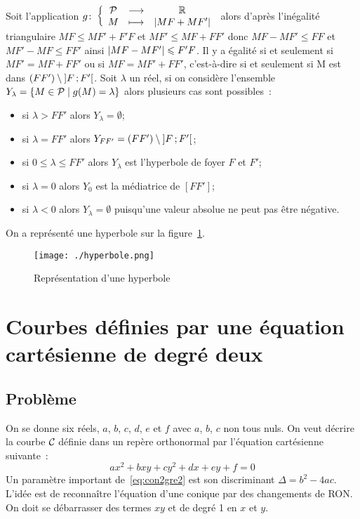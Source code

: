 Soit l'application \(g\colon \left\{\begin{array}{ccc} \mathcal{P} & \longrightarrow &\mathbb{R}\\ M & \longmapsto & \left\lvert MF+MF'\right\rvert \end{array} \right.\) alors d'après l'inégalité triangulaire \(MF \leqslant MF'+F'F\) et \(MF'\leqslant MF+FF'\) donc \(MF-MF'\leqslant FF\) et \(MF'-MF\leqslant FF'\) ainsi \(\left\lvert MF-MF'\right\rvert\leqslant F'F\). Il y a égalité si et seulement si \(MF'=MF+FF'\) ou si \(MF=MF'+FF'\), c'est-à-dire si et seulement si M est dans \((FF') \setminus \left] F \, ;  F' \right[\). Soit \(\lambda\) un réel, si on considère l'ensemble \(Y_{\lambda}=\left\{M \in \mathcal{P}\mathrel{}\middle|\mathrel{}g(M)=\lambda\right\}\) alors plusieurs cas sont possibles~:
\begin{itemize}
\item si \(\lambda>FF'\) alors \(Y_{\lambda}=\emptyset\);
\item si \(\lambda=FF'\) alors \(Y_{FF'}=(FF') \setminus \left] F \, ;  F' \right[\);
\item si \(0\leqslant\lambda\leqslant FF'\) alors \(Y_{\lambda}\) est l'hyperbole de foyer \(F\) et \(F'\);
\item si \(\lambda=0\) alors \(Y_{0}\) est la médiatrice de \([FF']\);
\item si \(\lambda<0\) alors \(Y_{\lambda}=\emptyset\) puisqu'une valeur absolue ne peut pas être négative.
\end{itemize}

On a représenté une hyperbole sur la figure~\ref{fig:hyperbole}.

\begin{figure}[!h]
  \centering
  \texttt{[image: ./hyperbole.png]}
  \caption{Représentation d'une hyperbole}
  \label{fig:hyperbole}
\end{figure}


\section{Courbes définies par une équation cartésienne de degré deux}
\label{sec:eqcart}
\subsection{Problème}
On se donne six réels, \(a\), \(b\), \(c\), \(d\), \(e\) et \(f\) avec \(a\), \(b\), \(c\) non tous nuls. On veut décrire la courbe \(\mathcal{C}_{{}}\) définie dans un repère orthonormal par l'équation cartésienne suivante~:
\begin{equation}
  ax^2+bxy+cy^2+dx+ey+f=0 \label{eq:con2gre2}
\end{equation}
Un paramètre important de~\eqref{eq:con2gre2} est son discriminant \(\Delta=b^2-4ac\). L'idée est de reconnaître l'équation d'une conique par des changements de RON\@. On doit se débarrasser des termes \(xy\) et de degré 1 en \(x\) et \(y\).

